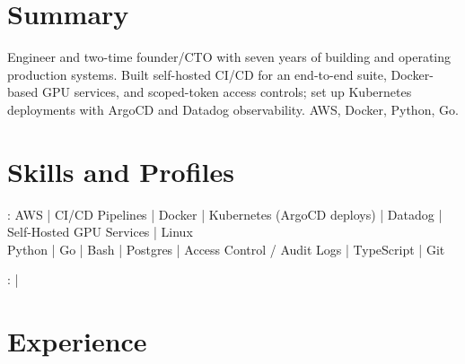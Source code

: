 \documentclass[print]{jack-resume}
\begin{document}
\pagecolor{darkmodeBackground}


\begin{minipage}[t][1cm][t]{.03\textwidth}
    \hfill
\end{minipage}

\section{Summary}
Engineer and two-time founder/CTO with seven years of building and operating production systems. Built self-hosted CI/CD for an end-to-end suite, Docker-based GPU services, and scoped-token access controls; set up Kubernetes deployments with ArgoCD and Datadog observability. AWS, Docker, Python, Go.
\sectionsep

\section{Skills and Profiles}
:
AWS \hfill | \hfill
CI/CD Pipelines \hfill | \hfill
Docker \hfill | \hfill
Kubernetes (ArgoCD deploys) \hfill | \hfill
Datadog \hfill | \hfill
Self-Hosted GPU Services \hfill | \hfill
Linux \\
\hspace{1.0cm} Python \hfill | \hfill
Go \hfill | \hfill
Bash \hfill | \hfill
Postgres \hfill | \hfill
Access Control / Audit Logs \hfill | \hfill
TypeScript \hfill | \hfill
Git \\

\raggedright{
    :
      \href{https://www.linkedin.com/in/jack-sturtevant/}{ \ExternalLink} |
     \href{https://github.com/jacksturt}{ \ExternalLink}}

\section{Experience}
\end{document}
